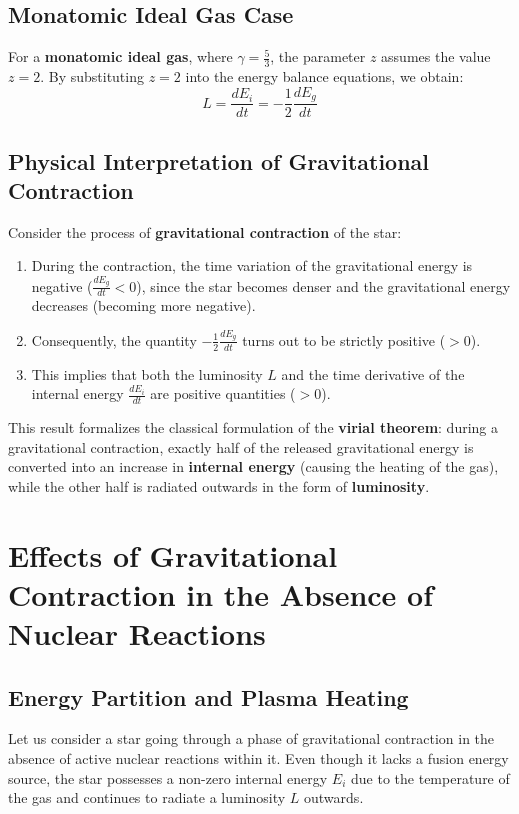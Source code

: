 \subsection{Monatomic Ideal Gas Case}
For a \textbf{monatomic ideal gas}, where $\gamma = \frac{5}{3}$, the parameter $z$ assumes the value $z = 2$. By substituting $z = 2$ into the energy balance equations, we obtain:
\begin{equation}
L = \frac{d E_i}{dt} = -\frac{1}{2} \frac{d E_g}{dt}
\end{equation}

\subsection{Physical Interpretation of Gravitational Contraction}
Consider the process of \textbf{gravitational contraction} of the star:
\begin{enumerate}
\item During the contraction, the time variation of the gravitational energy is negative ($\frac{d E_g}{dt} < 0$), since the star becomes denser and the gravitational energy decreases (becoming more negative).
\item Consequently, the quantity $-\frac{1}{2} \frac{d E_g}{dt}$ turns out to be strictly positive ($> 0$).
\item This implies that both the luminosity $L$ and the time derivative of the internal energy $\frac{d E_i}{dt}$ are positive quantities ($> 0$).
\end{enumerate}

This result formalizes the classical formulation of the \textbf{virial theorem}: during a gravitational contraction, exactly half of the released gravitational energy is converted into an increase in \textbf{internal energy} (causing the heating of the gas), while the other half is radiated outwards in the form of \textbf{luminosity}.

\section{Effects of Gravitational Contraction in the Absence of Nuclear Reactions}

\subsection{Energy Partition and Plasma Heating}
Let us consider a star going through a phase of gravitational contraction in the absence of active nuclear reactions within it. Even though it lacks a fusion energy source, the star possesses a non-zero internal energy $E_i$ due to the temperature of the gas and continues to radiate a luminosity $L$ outwards.

